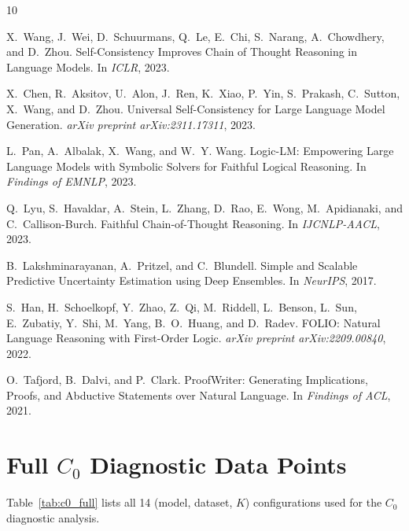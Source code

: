 \documentclass[11pt]{article}
\begin{document}

\begin{thebibliography}{10}

X.~Wang, J.~Wei, D.~Schuurmans, Q.~Le, E.~Chi, S.~Narang, A.~Chowdhery, and D.~Zhou.
\newblock Self-Consistency Improves Chain of Thought Reasoning in Language Models.
\newblock In \emph{ICLR}, 2023.

X.~Chen, R.~Aksitov, U.~Alon, J.~Ren, K.~Xiao, P.~Yin, S.~Prakash, C.~Sutton, X.~Wang, and D.~Zhou.
\newblock Universal Self-Consistency for Large Language Model Generation.
\newblock \emph{arXiv preprint arXiv:2311.17311}, 2023.

L.~Pan, A.~Albalak, X.~Wang, and W.~Y. Wang.
\newblock Logic-LM: Empowering Large Language Models with Symbolic Solvers for Faithful Logical Reasoning.
\newblock In \emph{Findings of EMNLP}, 2023.

Q.~Lyu, S.~Havaldar, A.~Stein, L.~Zhang, D.~Rao, E.~Wong, M.~Apidianaki, and C.~Callison-Burch.
\newblock Faithful Chain-of-Thought Reasoning.
\newblock In \emph{IJCNLP-AACL}, 2023.

B.~Lakshminarayanan, A.~Pritzel, and C.~Blundell.
\newblock Simple and Scalable Predictive Uncertainty Estimation using Deep Ensembles.
\newblock In \emph{NeurIPS}, 2017.

S.~Han, H.~Schoelkopf, Y.~Zhao, Z.~Qi, M.~Riddell, L.~Benson, L.~Sun, E.~Zubatiy, Y.~Shi, M.~Yang, B.~O.~Huang, and D.~Radev.
\newblock FOLIO: Natural Language Reasoning with First-Order Logic.
\newblock \emph{arXiv preprint arXiv:2209.00840}, 2022.

O.~Tafjord, B.~Dalvi, and P.~Clark.
\newblock ProofWriter: Generating Implications, Proofs, and Abductive Statements over Natural Language.
\newblock In \emph{Findings of ACL}, 2021.

\end{thebibliography}

\appendix

\section{Full $C_0$ Diagnostic Data Points}
\label{app:c0_data}

Table~\ref{tab:c0_full} lists all 14 (model, dataset, $K$) configurations used for the $C_0$ diagnostic analysis.
\end{document}

